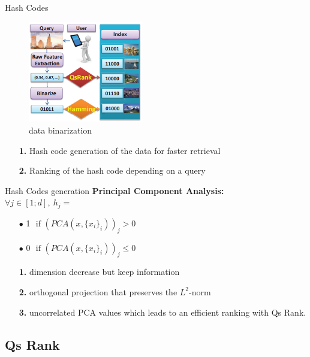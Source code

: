 \documentclass[english]{beamer}
\theoremstyle{plain}
\theoremstyle{remark}
\begin{document}
\begin{frame}{Hash Codes}

\begin{figure}[htbp]
	\begin{center}
	\includegraphics[width=5cm]{Images/intro2.png}
	\caption{data binarization}
	\end{center}
	\label{fig:intro2}
\end{figure}
\begin{itemize}
	\item[\textbf{1.}] Hash code generation of the data for faster retrieval
	\item[\textbf{2.}] Ranking of the hash code depending on a query
\end{itemize}

\end{frame}

\begin{frame}{Hash Codes generation}
\textbf{Principal Component Analysis:}\\
\vspace{1em}
$\forall j \in [1;d],\ h_j = $	
\begin{itemize}
    \item[$\bullet$]1 $\text{ if }(PCA(x, \{x_i\}_i))_j > 0$
    \item[$\bullet$]0 $\text{ if }(PCA(x, \{x_i\}_i))_j \leq 0$
\end{itemize}
\pause
\vspace{1em}
\begin{itemize}
	\item[\textbf{1.}]dimension decrease but keep information
	\item[\textbf{2.}]orthogonal projection that preserves the $L^2$-norm
	\item[\textbf{3.}]uncorrelated PCA values which leads to an efficient ranking with Qs Rank.
\end{itemize}
\end{frame}

\subsection{Qs Rank}
\end{document}
